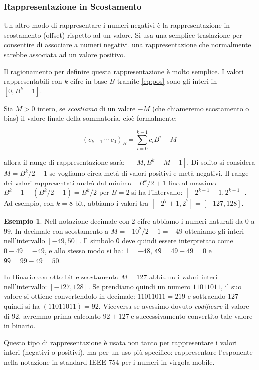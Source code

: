 \documentclass[a4paper]{book}
\theoremstyle{definition}
\newtheorem{ex}{Esempio}
\begin{document}
\subsubsection{Rappresentazione in Scostamento}

Un altro modo di rappresentare i numeri negativi è la rappresentazione in scostamento (offset) rispetto ad un valore. Si usa una semplice traslazione
per consentire di associare a numeri negativi, una rappresentazione che normalmente sarebbe associata ad un valore positivo.
 
Il ragionamento per definire questa rappresentazione è molto semplice. I valori
rappresentabili con $k$ cifre in base $B$ tramite \eqref{eq:pos} sono gli interi in $[0,B^k-1]$. 

Sia $M > 0$ intero, se \emph{scostiamo} di un valore $-M$ (che chiameremo scostamento o bias) il valore finale della sommatoria, cioè formalmente:

\[ (c_{k-1}\,\cdots\,c_{0})_B = \sum_{i=0}^{k-1} c_iB^i - M \] 

\noindent allora il range di rappresentazione sarà: $[-M,B^k-M-1]$. Di solito
si considera $M = B^k/2-1$ se vogliamo circa metà di valori positivi e metà negativi. Il range dei valori rappresentati andrà dal minimo $-B^k/2+1$ fino al massimo $B^k-1-(B^k/2-1) = B^k/2$ per $B=2$ si ha l'intervallo: $[-2^{k-1}-1,2^{k-1}]$. Ad esempio, con $k = 8$ bit, abbiamo i valori tra $[-2^7+1,2^7] = [-127,128]$.

\begin{ex} Nell notazione decimale con $2$ cifre abbiamo i numeri naturali da $0$ a $99$. In decimale con scostamento a $M = -10^2/2 + 1 = -49$ otteniamo gli interi nell'intervallo $[-49,50]$. Il simbolo $\mathsf 0$ deve quindi essere interpretato come $0-49 = -49$, e allo stesso modo si ha: $\mathsf{1} = -48$, $\mathsf{49} = 49 - 49 = 0$ e $\mathsf{99} = 99 - 49 = 50$.

In Binario con otto bit e scostamento $M = 127$ abbiamo i valori interi nell'intervallo: $[-127,128]$. Se prendiamo quindi un numero $11011011$, il suo valore si ottiene convertendolo in decimale:
$11011011 = 219$ e sottraendo $127$ quindi si ha $(11011011) = 92$. Viceversa se avessimo dovuto \emph{codificare} il valore di $92$, avremmo prima calcolato $92+127$ e successivamento convertito tale valore in binario.
\end{ex}	

Questo tipo di rappresentazione è usata non tanto per rappresentare i valori interi (negativi o positivi), ma per un uso più specifico: rappresentare l'esponente nella notazione in standard \textrm{IEEE-754} per i numeri in virgola mobile.
\end{document}
